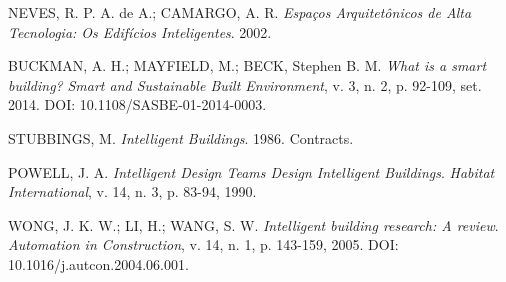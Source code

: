 \begin{thebibliography}{}

NEVES, R. P. A. de A.; CAMARGO, A. R. \emph{Espaços Arquitetônicos de Alta Tecnologia: Os Edifícios Inteligentes}. 2002.

BUCKMAN, A. H.; MAYFIELD, M.; BECK, Stephen B. M. \emph{What is a smart building?} \emph{Smart and Sustainable Built Environment}, v. 3, n. 2, p. 92-109, set. 2014. DOI: 10.1108/SASBE-01-2014-0003.

STUBBINGS, M. \emph{Intelligent Buildings}. 1986. Contracts.

POWELL, J. A. \emph{Intelligent Design Teams Design Intelligent Buildings}. \emph{Habitat International}, v. 14, n. 3, p. 83-94, 1990.

WONG, J. K. W.; LI, H.; WANG, S. W. \emph{Intelligent building research: A review}. \emph{Automation in Construction}, v. 14, n. 1, p. 143-159, 2005. DOI: 10.1016/j.autcon.2004.06.001.

\end{thebibliography}
    